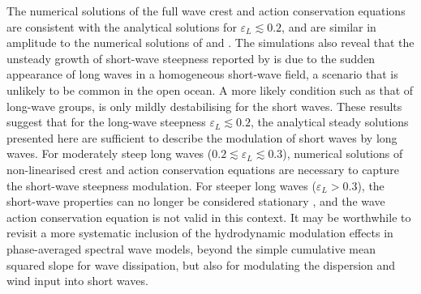 \documentclass[lineno]{jfm}
\begin{document}
The numerical solutions of the full wave crest and action conservation equations
are consistent with the analytical solutions for $\varepsilon_L \lesssim 0.2$,
and are similar in amplitude to the numerical solutions of
\citet{longuet1987propagation} and \citet{zhang1990evolution}.
The simulations also reveal that the unsteady growth of short-wave steepness
reported by \citet{peureux2021unsteady} is due to the sudden appearance of
long waves in a homogeneous short-wave field, a scenario that is unlikely to
be common in the open ocean.
A more likely condition such as that of long-wave groups, is only mildly
destabilising for the short waves.
These results suggest that for the long-wave steepness $\varepsilon_L \lesssim 0.2$,
the analytical steady solutions presented here are sufficient to describe the
modulation of short waves by long waves.
For moderately steep long waves ($0.2 \lesssim \varepsilon_L \lesssim 0.3$),
numerical solutions of non-linearised crest and action conservation equations
are necessary to capture the short-wave steepness modulation.
For steeper long waves ($\varepsilon_L > 0.3$), the short-wave properties can
no longer be considered stationary \citep{bretherton1968wavetrains}, and the
wave action conservation equation is not valid in this context.
It may be worthwhile to revisit a more systematic inclusion of the hydrodynamic
modulation effects in phase-averaged spectral wave models, beyond the simple
cumulative mean squared slope for wave dissipation, but also for modulating
the dispersion and wind input into short waves.




\end{document}
